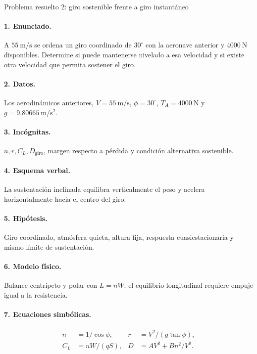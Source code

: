 \begin{studiumworked}{Problema resuelto 2: giro sostenible frente a giro instantáneo}

\paragraph{1. Enunciado.} A $55\ \mathrm{m/s}$ se ordena un giro coordinado de $30^\circ$ con la aeronave anterior y $4000\ \mathrm N$ disponibles. Determine si puede mantenerse nivelado a esa velocidad y si existe otra velocidad que permita sostener el giro.
\paragraph{2. Datos.} Los aerodinámicos anteriores, $V=55\ \mathrm{m/s}$, $\phi=30^\circ$, $T_A=4000\ \mathrm N$ y $g=9.80665\ \mathrm{m/s^2}$.
\paragraph{3. Incógnitas.} $n,r,C_L,D_{\mathrm{giro}}$, margen respecto a pérdida y condición alternativa sostenible.
\paragraph{4. Esquema verbal.} La sustentación inclinada equilibra verticalmente el peso y acelera horizontalmente hacia el centro del giro.
\paragraph{5. Hipótesis.} Giro coordinado, atmósfera quieta, altura fija, respuesta cuasiestacionaria y mismo límite de sustentación.
\paragraph{6. Modelo físico.} Balance centrípeto y polar con $L=nW$; el equilibrio longitudinal requiere empuje igual a la resistencia.
\paragraph{7. Ecuaciones simbólicas.} \[\begin{aligned}n&=1/\cos\phi,& r&=V^2/(g\tan\phi),\\ C_L&=nW/(qS),& D&=AV^2+Bn^2/V^2.\end{aligned}\]

\end{studiumworked}

